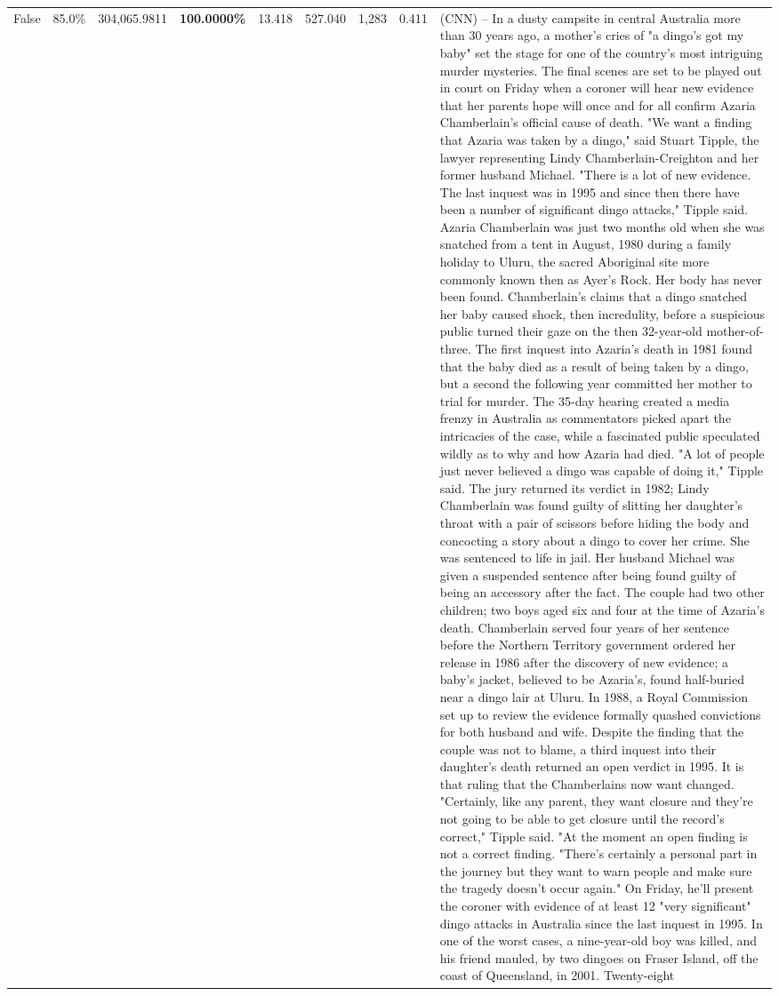\begin{table}[H]
\begin{tabular}{lllrlllll}
False & 85.0\% & \color{red} 304,065.9811 & \bfseries \color{red} 100.0000\% & 13.418 & 527.040 & 1,283 & 0.411 & (CNN) -- In a dusty campsite in central Australia more than 30 years ago, a mother's cries of "a dingo's got my baby" set the stage for one of the country's most intriguing murder mysteries. The final scenes are set to be played out in court on Friday when a coroner will hear new evidence that her parents hope will once and for all confirm Azaria Chamberlain's official cause of death. "We want a finding that Azaria was taken by a dingo," said Stuart Tipple, the lawyer representing Lindy Chamberlain-Creighton and her former husband Michael. "There is a lot of new evidence. The last inquest was in 1995 and since then there have been a number of significant dingo attacks," Tipple said. Azaria Chamberlain was just two months old when she was snatched from a tent in August, 1980 during a family holiday to Uluru, the sacred Aboriginal site more commonly known then as Ayer's Rock. Her body has never been found. Chamberlain's claims that a dingo snatched her baby caused shock, then incredulity, before a suspicious public turned their gaze on the then 32-year-old mother-of-three. The first inquest into Azaria's death in 1981 found that the baby died as a result of being taken by a dingo, but a second the following year committed her mother to trial for murder. The 35-day hearing created a media frenzy in Australia as commentators picked apart the intricacies of the case, while a fascinated public speculated wildly as to why and how Azaria had died. "A lot of people just never believed a dingo was capable of doing it," Tipple said. The jury returned its verdict in 1982; Lindy Chamberlain was found guilty of slitting her daughter's throat with a pair of scissors before hiding the body and concocting a story about a dingo to cover her crime. She was sentenced to life in jail. Her husband Michael was given a suspended sentence after being found guilty of being an accessory after the fact. The couple had two other children; two boys aged six and four at the time of Azaria's death. Chamberlain served four years of her sentence before the Northern Territory government ordered her release in 1986 after the discovery of new evidence; a baby's jacket, believed to be Azaria's, found half-buried near a dingo lair at Uluru. In 1988, a Royal Commission set up to review the evidence formally quashed convictions for both husband and wife. Despite the finding that the couple was not to blame, a third inquest into their daughter's death returned an open verdict in 1995. It is that ruling that the Chamberlains now want changed. "Certainly, like any parent, they want closure and they're not going to be able to get closure until the record's correct," Tipple said. "At the moment an open finding is not a correct finding. "There's certainly a personal part in the journey but they want to warn people and make sure the tragedy doesn't occur again." On Friday, he'll present the coroner with evidence of at least 12 "very significant" dingo attacks in Australia since the last inquest in 1995. In one of the worst cases, a nine-year-old boy was killed, and his friend mauled, by two dingoes on Fraser Island, off the coast of Queensland, in 2001. Twenty-eight 
\end{tabular}
\end{table}
